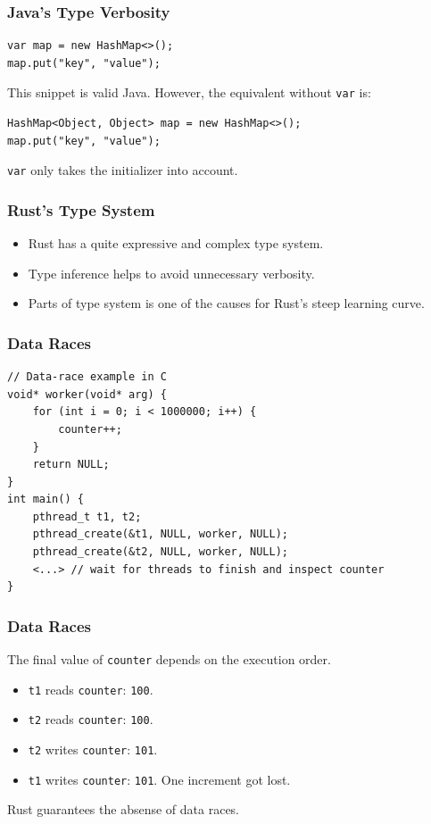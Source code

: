 \begin{frame}[fragile]
    \frametitle{Java's Type Verbosity}
    \begin{verbatim}
var map = new HashMap<>();
map.put("key", "value");
    \end{verbatim}
    \pause
    \vfill
    This snippet is valid Java.
    However, the equivalent without \texttt{var} is:
    \pause
    \vfill
    \begin{verbatim}
HashMap<Object, Object> map = new HashMap<>();
map.put("key", "value");
    \end{verbatim}
    \pause
    \vfill
    \texttt{var} only takes the initializer into account.
\end{frame}

\begin{frame}[fragile]
    \frametitle{Rust's Type System}
    \begin{itemize}
        \item Rust has a quite expressive and complex type system.
        \item Type inference helps to avoid unnecessary verbosity.
        \pause
        \item Parts of type system is one of the causes for Rust's steep learning curve.
    \end{itemize}
\end{frame}

\begin{frame}[fragile]
    \frametitle{Data Races}
    \begin{verbatim}
// Data-race example in C
void* worker(void* arg) {
    for (int i = 0; i < 1000000; i++) {
        counter++;
    }
    return NULL;
}
int main() {
    pthread_t t1, t2;
    pthread_create(&t1, NULL, worker, NULL);
    pthread_create(&t2, NULL, worker, NULL);
    <...> // wait for threads to finish and inspect counter
}
    \end{verbatim}
\end{frame}

\begin{frame}[fragile]
    \frametitle{Data Races}
    The final value of \texttt{counter} depends on the execution order.
    \vfill
    \begin{itemize}
        \item \texttt{t1} reads \texttt{counter}: \texttt{100}.
        \item \texttt{t2} reads \texttt{counter}: \texttt{100}.
        \item \texttt{t2} writes \texttt{counter}: \texttt{101}.
        \item \texttt{t1} writes \texttt{counter}: \texttt{101}. One increment got lost.
    \end{itemize}
    \pause
    \vfill
    Rust guarantees the absense of data races.
\end{frame}

